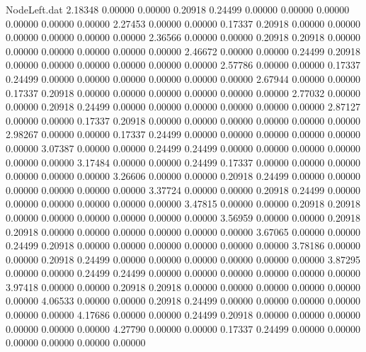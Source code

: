 \begin{filecontents}{NodeLeft.dat}
   2.18348    0.00000    0.00000     0.20918    0.24499    0.00000    0.00000    0.00000    0.00000    0.00000    0.00000
   2.27453    0.00000    0.00000     0.17337    0.20918    0.00000    0.00000    0.00000    0.00000    0.00000    0.00000
   2.36566    0.00000    0.00000     0.20918    0.20918    0.00000    0.00000    0.00000    0.00000    0.00000    0.00000
   2.46672    0.00000    0.00000     0.24499    0.20918    0.00000    0.00000    0.00000    0.00000    0.00000    0.00000
   2.57786    0.00000    0.00000     0.17337    0.24499    0.00000    0.00000    0.00000    0.00000    0.00000    0.00000
   2.67944    0.00000    0.00000     0.17337    0.20918    0.00000    0.00000    0.00000    0.00000    0.00000    0.00000
   2.77032    0.00000    0.00000     0.20918    0.24499    0.00000    0.00000    0.00000    0.00000    0.00000    0.00000
   2.87127    0.00000    0.00000     0.17337    0.20918    0.00000    0.00000    0.00000    0.00000    0.00000    0.00000
   2.98267    0.00000    0.00000     0.17337    0.24499    0.00000    0.00000    0.00000    0.00000    0.00000    0.00000
   3.07387    0.00000    0.00000     0.24499    0.24499    0.00000    0.00000    0.00000    0.00000    0.00000    0.00000
   3.17484    0.00000    0.00000     0.24499    0.17337    0.00000    0.00000    0.00000    0.00000    0.00000    0.00000
   3.26606    0.00000    0.00000     0.20918    0.24499    0.00000    0.00000    0.00000    0.00000    0.00000    0.00000
   3.37724    0.00000    0.00000     0.20918    0.24499    0.00000    0.00000    0.00000    0.00000    0.00000    0.00000
   3.47815    0.00000    0.00000     0.20918    0.20918    0.00000    0.00000    0.00000    0.00000    0.00000    0.00000
   3.56959    0.00000    0.00000     0.20918    0.20918    0.00000    0.00000    0.00000    0.00000    0.00000    0.00000
   3.67065    0.00000    0.00000     0.24499    0.20918    0.00000    0.00000    0.00000    0.00000    0.00000    0.00000
   3.78186    0.00000    0.00000     0.20918    0.24499    0.00000    0.00000    0.00000    0.00000    0.00000    0.00000
   3.87295    0.00000    0.00000     0.24499    0.24499    0.00000    0.00000    0.00000    0.00000    0.00000    0.00000
   3.97418    0.00000    0.00000     0.20918    0.20918    0.00000    0.00000    0.00000    0.00000    0.00000    0.00000
   4.06533    0.00000    0.00000     0.20918    0.24499    0.00000    0.00000    0.00000    0.00000    0.00000    0.00000
   4.17686    0.00000    0.00000     0.24499    0.20918    0.00000    0.00000    0.00000    0.00000    0.00000    0.00000
   4.27790    0.00000    0.00000     0.17337    0.24499    0.00000    0.00000    0.00000    0.00000    0.00000    0.00000

\end{filecontents}
